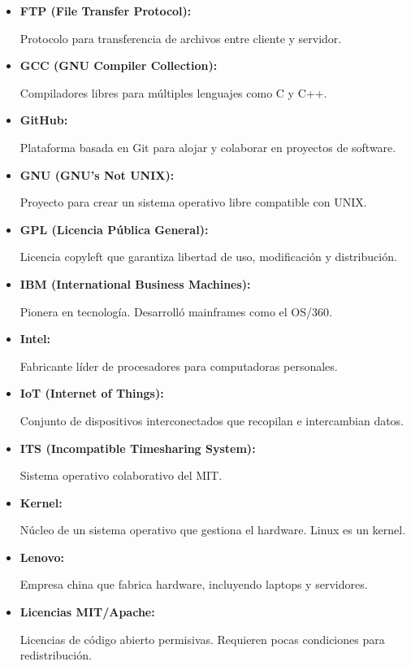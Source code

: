 \documentclass[a4paper,12pt]{article}
\begin{document}
\begin{itemize}
\item \hypertarget{ftp}{\textbf{FTP (File Transfer Protocol):}} Protocolo para
transferencia de archivos entre cliente y servidor.  \label{ftp}

\item \hypertarget{gcc}{\textbf{GCC (GNU Compiler Collection):}} Compiladores
libres para múltiples lenguajes como C y C++.  \label{gcc}

\item \hypertarget{github}{\textbf{GitHub:}} Plataforma basada en Git para
alojar y colaborar en proyectos de software.  \label{github}

\item \hypertarget{gnu}{\textbf{GNU (GNU's Not UNIX):}} Proyecto para crear un
sistema operativo libre compatible con UNIX.  \label{gnu}

\item \hypertarget{gpl}{\textbf{GPL (Licencia Pública General):}} Licencia
copyleft que garantiza libertad de uso, modificación y distribución.
\label{gpl}

\item \hypertarget{ibm}{\textbf{IBM (International Business Machines):}} Pionera
en tecnología. Desarrolló mainframes como el OS/360.  \label{ibm}

\item \hypertarget{intel}{\textbf{Intel:}} Fabricante líder de procesadores para
computadoras personales.  \label{intel}

\item \hypertarget{iot}{\textbf{IoT (Internet of Things):}} Conjunto de
dispositivos interconectados que recopilan e intercambian datos.  \label{iot}

\item \hypertarget{its}{\textbf{ITS (Incompatible Timesharing System):}} Sistema
operativo colaborativo del MIT.  \label{its}

\item \hypertarget{kernel}{\textbf{Kernel:}} Núcleo de un sistema operativo que
gestiona el hardware. Linux es un kernel.  \label{kernel}

\item \hypertarget{lenovo}{\textbf{Lenovo:}} Empresa china que fabrica hardware,
incluyendo laptops y servidores.  \label{lenovo}

\item \hypertarget{licencias mit/apache}{\textbf{Licencias MIT/Apache:}}
Licencias de código abierto permisivas. Requieren pocas condiciones para
redistribución.  \label{mitapache}


\end{itemize}
\end{document}
